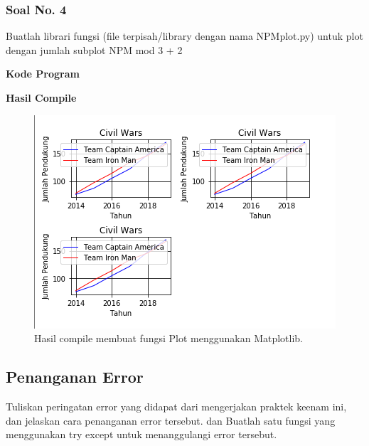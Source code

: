 \subsubsection{Soal No. 4}
\hfill \break
Buatlah librari fungsi (file terpisah/library dengan nama NPMplot.py) untuk plot dengan jumlah subplot NPM mod 3 + 2

\hfill \break
\textbf{Kode Program}



\hfill \break
\textbf{Hasil Compile}

\begin{figure}[H]
	\includegraphics[width=12cm]{figures/6/1154016/praktek/p4.png}
	\centering
	\caption{Hasil compile membuat fungsi Plot menggunakan Matplotlib.}
\end{figure}


\subsection{Penanganan Error}
Tuliskan  peringatan  error  yang  didapat  dari  mengerjakan  praktek  keenam  ini, dan  jelaskan  cara  penanganan  error  tersebut. dan  Buatlah  satu  fungsi  yang menggunakan try except untuk menanggulangi error tersebut.

